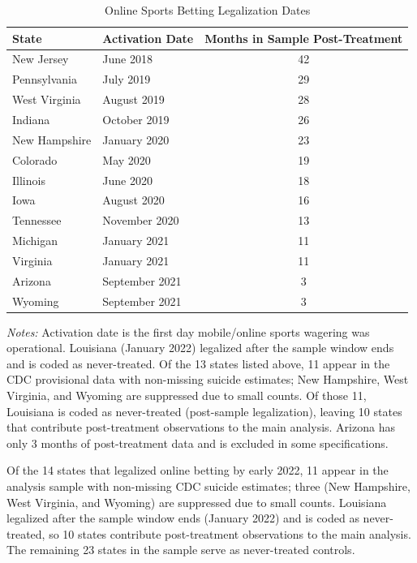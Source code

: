 \documentclass[12pt]{article}
\begin{document}
\begin{table}[H]
\centering
\caption{Online Sports Betting Legalization Dates}
\begin{threeparttable}
\begin{tabular}{llc}
\toprule
State & Activation Date & Months in Sample Post-Treatment \\
\midrule
New Jersey & June 2018 & 42 \\
Pennsylvania & July 2019 & 29 \\
West Virginia & August 2019 & 28 \\
Indiana & October 2019 & 26 \\
New Hampshire & January 2020 & 23 \\
Colorado & May 2020 & 19 \\
Illinois & June 2020 & 18 \\
Iowa & August 2020 & 16 \\
Tennessee & November 2020 & 13 \\
Michigan & January 2021 & 11 \\
Virginia & January 2021 & 11 \\
Arizona & September 2021 & 3 \\
Wyoming & September 2021 & 3 \\
\bottomrule
\end{tabular}
\begin{tablenotes}[flushleft]
\small
\item \textit{Notes:} Activation date is the first day mobile/online sports wagering was operational. Louisiana (January 2022) legalized after the sample window ends and is coded as never-treated. Of the 13 states listed above, 11 appear in the CDC provisional data with non-missing suicide estimates; New Hampshire, West Virginia, and Wyoming are suppressed due to small counts. Of those 11, Louisiana is coded as never-treated (post-sample legalization), leaving 10 states that contribute post-treatment observations to the main analysis. Arizona has only 3 months of post-treatment data and is excluded in some specifications.
\end{tablenotes}
\end{threeparttable}
\label{tab:timing}
\end{table}

Of the 14 states that legalized online betting by early 2022, 11 appear in the analysis sample with non-missing CDC suicide estimates; three (New Hampshire, West Virginia, and Wyoming) are suppressed due to small counts. Louisiana legalized after the sample window ends (January 2022) and is coded as never-treated, so 10 states contribute post-treatment observations to the main analysis. The remaining 23 states in the sample serve as never-treated controls.
\end{document}
